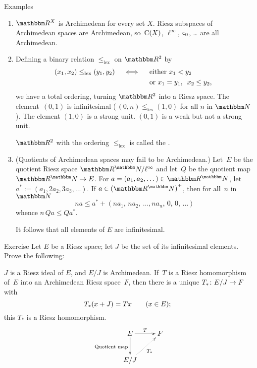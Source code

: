 \documentclass[main.tex]{subfiles}
\begin{document}
\begin{psec}{3.3}{Examples}
\begin{enumerate}
\item \label{3.3-1}
$\R^X$ is Archimedean for every set $X$.
Riesz subspaces of Archimedean spaces are Archimedean,
so~$\mathrm{C}(X)$, $\ell^\infty$, $\mathsf{c}_0$, \ldots{} 
are all Archimedean.
%
\item \label{3.3-2}%
\newcommand{\leqlex}{\leq_{\mathrm{lex}}}
Defining a binary relation $\leqlex$ on $\R^2$ by
\begin{align*}
(x_1,x_2) \leqlex (y_1,y_2)   \quad \iff \quad
& \htam{ either }x_1<y_2 \\
& \htam{ or }x_1 = y_1\htam{, }\ x_2 \leq y_2\htam{, }
\end{align*}
we have a total ordering,
turning $\R^2$ into a Riesz space.
The element~$(0,1)$ is infinitesimal
(\,$(0,n)\leqlex(1,0)$ for all $n$ in $\N$).
The element $(1,0)$ is a strong unit.
$(0,1)$ is a weak but not a strong unit.

$\R^2$ with the ordering $\leqlex$ is called
the .
%
\item \label{3.3-3}%
(Quotients of Archimedean spaces may fail to be Archimedean.)
Let~$E$ be the quotient Riesz space $\R^\N / \ell^\infty$
and let~$Q$ be the quotient map $\R^\N\ra E$.
For $a=(a_1, a_2, \dotsc)\in \R^\N$,
let $a^* := (a_1,2a_2,3a_3,\dotsc)$.
If $a\in \smash{{(\R^\N)}^+}$, then for all~$n$ in~$\N$
\begin{equation*}
na \leq a^* + (na_1,\, na_2,\, \dotsc, na_n,\, 0,\, 0,\, \dotsc)
\end{equation*}
whence $n\, Qa\leq Qa^*$.

It follows that all elements of $E$ are infinitesimal.
\end{enumerate}
\end{psec}
%
%
\begin{psec}{3.4}{Exercise}
Let $E$ be a Riesz space;
let $J$ be the set of its infinitesimal elements.
Prove the following:

$J$ is a Riesz ideal of $E$, 
and $E/J$ is Archimedean.
If~$T$ is a Riesz homomorphism of~$E$
into an Archimedean Riesz  space~$F$,
then there is a unique
$T_*\colon E/J\rightarrow F$ with
\begin{equation*}
T_*(x+J) = Tx \qquad (x\in E)\text{; }
\end{equation*}
this $T_*$ is a Riesz homomorphism.
\begin{equation*}
\xymatrix{
 E \ar[d]_{\htam{Quotient map}}\ar[r]^T & F \\
 E/J\ar@{.>}[ru]_{T_*} &
}
\end{equation*}
\end{psec}
\end{document}
